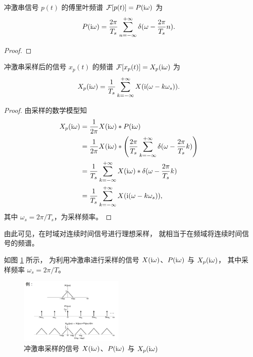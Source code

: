 \begin{property}
    冲激串信号 $p(t)$ 的傅里叶频谱 $\mathcal{F}[p(t)] = P(\mathrm{i} \omega)$ 为
    \begin{align*}
        P(\mathrm{i} \omega) = \frac{2\pi}{T_s}\sum_{n = -\infty}^{+\infty}\delta(\omega - \frac{2\pi}{T_s}n).
    \end{align*}
\end{property}

\begin{proof}
    
\end{proof}

\begin{property}
    冲激串采样后的信号 $x_p(t)$ 的频谱 $\mathcal{F}[x_p(t)] = X_p(\mathrm{i} \omega)$ 为
    \begin{align*}
        X_p(\mathrm{i} \omega) = \frac{1}{T_s}\sum_{k = -\infty}^{+\infty}X(\mathrm{i}(\omega - k\omega_s)).
    \end{align*}
\end{property}

\begin{proof}
    由采样的数学模型知
    \begin{align*}
        X_p(\mathrm{i} \omega) & = \frac{1}{2\pi}X(\mathrm{i} \omega) * P(\mathrm{i} \omega) \\
        & = \frac{1}{2\pi}X(\mathrm{i} \omega) * \left(\frac{2\pi}{T_s}\sum_{k = -\infty}^{+\infty}\delta(\omega - \frac{2\pi}{T_s}k)\right) \\
        & = \frac{1}{T_s}\sum_{k = -\infty}^{+\infty}X(\mathrm{i} \omega) * \delta(\omega - \frac{2\pi}{T_s}k) \\
        & = \frac{1}{T_s}\sum_{k = -\infty}^{+\infty}X(\mathrm{i}(\omega - k\omega_s)),
    \end{align*}
    其中 $\omega_s = 2\pi/T_s$，为采样频率。
\end{proof}

\begin{remark}
    由此可见，在时域对连续时间信号进行理想采样，
    就相当于在频域将连续时间信号的频谱。
\end{remark}

\begin{example}
    如图 \ref{fig:impulse-sampling-frequency} 所示，
    为利用冲激串进行采样的信号 $X(\mathrm{i} \omega)$、$P(\mathrm{i} \omega)$ 与 $X_p(\mathrm{i} \omega)$，
    其中采样频率 $\omega_s = 2\pi/T$。
    \begin{figure}[H]
        \centering
        \includegraphics[width=0.45\textwidth]{chap2/img/impulse-sampling-frequency.png}
        \caption{冲激串采样的信号 $X(\mathrm{i} \omega)$、$P(\mathrm{i} \omega)$ 与 $X_p(\mathrm{i} \omega)$}
        \label{fig:impulse-sampling-frequency}
    \end{figure}
\end{example}


